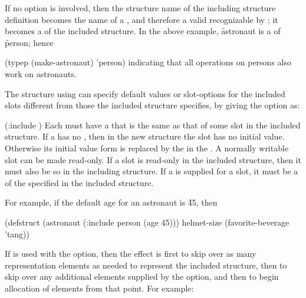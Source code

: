 If no  option is involved, then
the structure name of the including structure definition
becomes the name of a , and therefore
a valid  recognizable by ; it becomes
a  of the included structure.  
In the above example,
\f{astronaut} is a  of \f{person}; hence

\code
 (typep (make-astronaut) 'person) \EV {}
\endcode
indicating that all operations on persons also
work on astronauts.

The structure using  can specify default values or
slot-options for the included slots different from those the included
structure specifies, by giving the  option as:

\code
 (:include  )
\endcode
Each  must have a  
that is the same
as that of some slot in the included structure.
If a  has no ,
then in the new structure the slot has no initial value.
Otherwise its initial value form is replaced by
the  in the .
A normally writable slot can be made read-only.
If a slot is read-only in the included structure, then it
must also be so in the including structure.
If a  is supplied for a slot, it must be 
a  of
the
 specified in the included structure.

For example, if the
default age for an astronaut is \f{45}, then 

\code
 (defstruct (astronaut (:include person (age 45)))
    helmet-size
    (favorite-beverage 'tang))
\endcode


If  is used with the 
option, then the effect is first to skip over as many representation
elements as needed to represent the included structure, then to
skip over any additional elements supplied by the 
option, and then to begin allocation of elements from that point.
For example:

